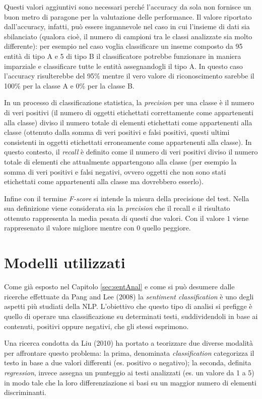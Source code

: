 \documentclass[a4paper,12pt,openright,twoside]{report}
\theoremstyle{definition}
\begin{document}
Questi valori aggiuntivi sono necessari perché l'accuracy da sola non fornisce un buon metro di paragone
per la valutazione delle performance. Il valore riportato dall'accuracy, infatti, può essere ingannevole
nel caso in cui l'insieme di dati sia sbilanciato (qualora cioè, il numero di campioni tra le classi analizzate
sia molto differente): per esempio nel caso voglia classificare un inseme composto da 95 entità di tipo A
e 5 di tipo B il classificatore potrebbe funzionare in maniera imparziale e classificare tutte le entità 
assegnandogli il tipo A. In questo caso l'accuracy risulterebbe del 95\% mentre il vero valore di riconoscimento
 sarebbe il 100\% per la classe A e 0\% per la classe B.

In un processo di classificazione statistica, la \emph{precision} per una classe è il numero di 
veri positivi (il numero di oggetti etichettati correttamente come appartenenti alla classe) 
diviso il numero totale di elementi etichettati come appartenenti alla classe 
(ottenuto dalla somma di veri positivi e falsi positivi, 
questi ultimi consistenti in oggetti etichettati erroneamente 
come appartenenti alla classe). In questo contesto, il \emph{recall} è definito come il numero 
di veri positivi diviso il numero totale di elementi che attualmente appartengono alla classe 
(per esempio la somma di veri positivi e falsi negativi, ovvero oggetti che non 
sono stati etichettati come appartenenti alla classe ma dovrebbero esserlo).

Infine con il termine \emph{F-score} si intende la misura della precisione del test. Nella sua
definizione viene considerata sia la \emph{precision} che il recall e il risultato ottenuto rappresenta
la media pesata di questi due valori. Con il valore $1$ viene rappresenato il valore migliore
mentre con 0 quello peggiore.

\section{Modelli utilizzati}
Come già esposto nel Capitolo \ref{sec:sentAnal} e come si può desumere
dalle ricerche effettuate da Pang and Lee (2008) %
la \emph{sentiment classification} è uno degli aspetti più studiati della NLP.
L’obiettivo che questo tipo di analisi si prefigge è quello di operare una classificazione su determinati testi, 
suddividendoli in base ai contenuti, positivi oppure negativi, che gli stessi esprimono. 

Una ricerca condotta da 
Liu (2010) %
ha portato a teorizzare due diverse modalità per affrontare questo problema: la prima, denominata
 \emph{classification}
categorizza il testo in base a due valori differenti (es. positivo o negativo); la seconda, definita 
\emph{regression}, invece assegna un punteggio ai testi analizzati (es. un valore da 1 a 5)
in modo tale che la loro differenziazione si basi su un maggior numero di elementi discriminanti.
\end{document}
